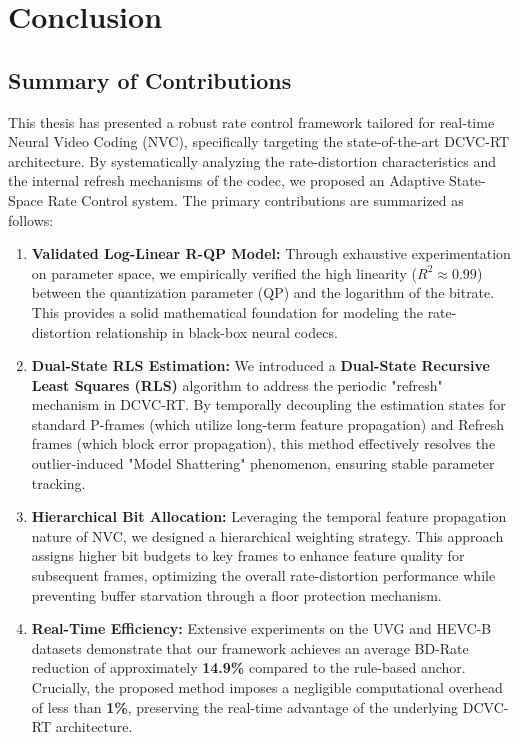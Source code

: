
\chapter{Conclusion}
\label{chap:conclusion}

\section{Summary of Contributions}
This thesis has presented a robust rate control framework tailored for real-time Neural Video Coding (NVC), specifically targeting the state-of-the-art DCVC-RT architecture. By systematically analyzing the rate-distortion characteristics and the internal refresh mechanisms of the codec, we proposed an Adaptive State-Space Rate Control system. The primary contributions are summarized as follows:

\begin{enumerate}
    \item \textbf{Validated Log-Linear R-QP Model:} Through exhaustive experimentation on parameter space, we empirically verified the high linearity ($R^2 \approx 0.99$) between the quantization parameter (QP) and the logarithm of the bitrate. This provides a solid mathematical foundation for modeling the rate-distortion relationship in black-box neural codecs.

    \item \textbf{Dual-State RLS Estimation:} We introduced a \textbf{Dual-State Recursive Least Squares (RLS)} algorithm to address the periodic "refresh" mechanism in DCVC-RT. By temporally decoupling the estimation states for standard P-frames (which utilize long-term feature propagation) and Refresh frames (which block error propagation), this method effectively resolves the outlier-induced "Model Shattering" phenomenon, ensuring stable parameter tracking.

    \item \textbf{Hierarchical Bit Allocation:} Leveraging the temporal feature propagation nature of NVC, we designed a hierarchical weighting strategy. This approach assigns higher bit budgets to key frames to enhance feature quality for subsequent frames, optimizing the overall rate-distortion performance while preventing buffer starvation through a floor protection mechanism.

    \item \textbf{Real-Time Efficiency:} Extensive experiments on the UVG and HEVC-B datasets demonstrate that our framework achieves an average BD-Rate reduction of approximately \textbf{14.9\%} compared to the rule-based anchor. Crucially, the proposed method imposes a negligible computational overhead of less than \textbf{1\%}, preserving the real-time advantage of the underlying DCVC-RT architecture.
\end{enumerate}

